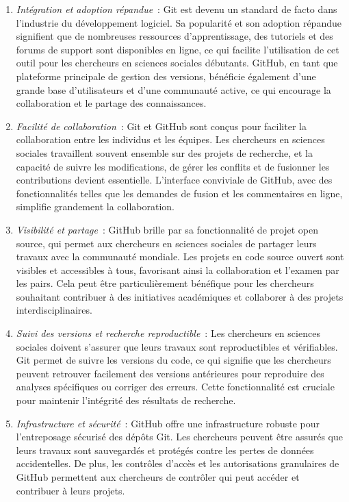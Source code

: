 \documentclass[
  letterpaper,
  DIV=11,
  numbers=noendperiod]{scrreprt}
\begin{document}
\begin{enumerate}
\def\labelenumi{\arabic{enumi}.}
\item
  \emph{Intégration et adoption répandue}~: Git est devenu un standard
  de facto dans l'industrie du développement logiciel. Sa popularité et
  son adoption répandue signifient que de nombreuses ressources
  d'apprentissage, des tutoriels et des forums de support sont
  disponibles en ligne, ce qui facilite l'utilisation de cet outil pour
  les chercheurs en sciences sociales débutants. GitHub, en tant que
  plateforme principale de gestion des versions, bénéficie également
  d'une grande base d'utilisateurs et d'une communauté active, ce qui
  encourage la collaboration et le partage des connaissances.
\item
  \emph{Facilité de collaboration}~: Git et GitHub sont conçus pour
  faciliter la collaboration entre les individus et les équipes. Les
  chercheurs en sciences sociales travaillent souvent ensemble sur des
  projets de recherche, et la capacité de suivre les modifications, de
  gérer les conflits et de fusionner les contributions devient
  essentielle. L'interface conviviale de GitHub, avec des
  fonctionnalités telles que les demandes de fusion et les commentaires
  en ligne, simplifie grandement la collaboration.
\item
  \emph{Visibilité et partage}~: GitHub brille par sa fonctionnalité de
  projet open source, qui permet aux chercheurs en sciences sociales de
  partager leurs travaux avec la communauté mondiale. Les projets en
  code source ouvert sont visibles et accessibles à tous, favorisant
  ainsi la collaboration et l'examen par les pairs. Cela peut être
  particulièrement bénéfique pour les chercheurs souhaitant contribuer à
  des initiatives académiques et collaborer à des projets
  interdisciplinaires.
\item
  \emph{Suivi des versions et recherche reproductible}~: Les chercheurs
  en sciences sociales doivent s'assurer que leurs travaux sont
  reproductibles et vérifiables. Git permet de suivre les versions du
  code, ce qui signifie que les chercheurs peuvent retrouver facilement
  des versions antérieures pour reproduire des analyses spécifiques ou
  corriger des erreurs. Cette fonctionnalité est cruciale pour maintenir
  l'intégrité des résultats de recherche.
\item
  \emph{Infrastructure et sécurité}~: GitHub offre une infrastructure
  robuste pour l'entreposage sécurisé des dépôts Git. Les chercheurs
  peuvent être assurés que leurs travaux sont sauvegardés et protégés
  contre les pertes de données accidentelles. De plus, les contrôles
  d'accès et les autorisations granulaires de GitHub permettent aux
  chercheurs de contrôler qui peut accéder et contribuer à leurs
  projets.
\end{enumerate}
\end{document}
